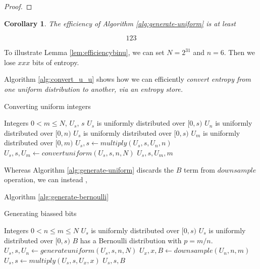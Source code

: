 \documentclass[12pt]{article}
\newtheorem{corollary}{Corollary}
\begin{document}
\begin{proof}

\end{proof}

\begin{corollary}
The efficiency of Algorithm \ref{alg:generate-uniform} is at least

\begin{equation}
123
\end{equation}
\end{corollary}

To illustrate Lemma \ref{lem:efficiencybinu}, we can set $N=2^{31}$ and $n=6$. Then we lose $xxx$ bits of entropy.

Algorithm \ref{alg:convert_u_u} shows how we can efficiently \em convert \em entropy from one uniform distribution to another, via an entropy store.

\begin{algorithm}
\caption{Converting uniform integers}
\label{alg:convert_u_u}
\begin{algorithmic}[1]
    \Require Integers $0 < m \le N$, $U_s$, $s$
    \Require $U_s$ is uniformly distributed over $[0,s)$
    \Require $U_n$ is uniformly distributed over $[0,n)$
    \Ensure  $U_s$ is uniformly distributed over $[0,s)$
    \Ensure  $U_m$ is uniformly distributed over $[0,m)$
    \State $U_s, s \gets multiply(U_s, s, U_n, n)$
    \State $U_s, s, U_m \gets convertuniform(U_s, s, n, N)$
    \State \Return $U_s, s, U_m, m$
\EndProcedure
\end{algorithmic}
\end{algorithm}



Whereas Algorithm \ref{alg:generate-uniform} discards the $B$ term from $downsample$ operation, we can instead , 

Algorithm \ref{alg:generate-bernoulli}

\begin{algorithm}
\caption{Generating biassed bits}
\label{alg:generate-bernoulli}
\begin{algorithmic}[1]
\Require Integers $0 < n \le m \le N$
\Require $U_s$ is uniformly distributed over $[0,s)$
\Ensure $U_s$ is uniformly distributed over $[0,s)$
\Ensure $B$ has a Bernoulli distribution with $p = m/n$.
    \State $U_s, s, U_n \gets generateuniform(U_s, s, n, N)$
    \State $U_x, x, B \gets downsample(U_n, n, m)$
    \State $U_s, s \gets multiply(U_s, s, U_x, x)$
    \State \Return $U_s, s, B$
\EndProcedure
\end{algorithmic}
\end{algorithm}
\end{document}
